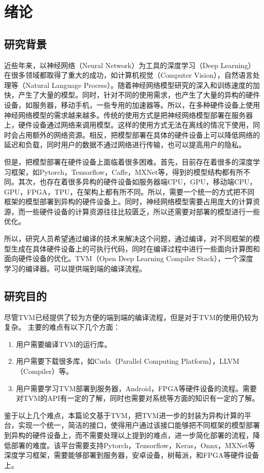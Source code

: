 \chapter{绪论}

\section{研究背景}

近些年来，以神经网络（Neural Network）为工具的深度学习（Deep Learning）在很多领域都取得了重大的成功，如计算机视觉（Computer Vision），自然语言处理等（Natural Language Process）。随着神经网络模型研究的深入和训练速度的加快，产生了大量的模型。同时，针对不同的使用需求，也产生了大量的异构的硬件设备，如服务器，移动手机，一些专用的加速器等。所以，在多种硬件设备上使用神经网络模型的需求越来越多。传统的使用方式是把神经网络模型部署在服务器上，硬件设备通过网络来调用模型。这样的使用方式无法在离线的情况下使用，同时会占用额外的网络资源。相反，把模型部署在具体的硬件设备上可以降低网络的延迟和负载，同时用户的数据不通过网络进行传输，也可以提高用户的隐私。

但是，把模型部署在硬件设备上面临着很多困难。首先，目前存在着很多的深度学习框架，如Pytorch，Tensorflow，Caffe，MXNet等，得到的模型结构都有所不同。其次，也存在着很多异构的硬件设备如服务器端CPU，GPU，移动端CPU，GPU，FPGA，TPU，在架构上都有所不同。所以，需要一个统一的方式把不同框架的模型部署到异构的硬件设备上。同时，神经网络模型需要占用庞大的计算资源，而一些硬件设备的计算资源往往比较匮乏，所以还需要对部署的模型进行一些优化。

所以，研究人员希望通过编译的技术来解决这个问题，通过编译，对不同框架的模型生成在具体硬件设备上的可执行代码，同时在编译过程中进行一些面向计算图和面向硬件设备的优化。TVM（Open Deep Learning Compiler Stack），一个深度学习的编译器。可以提供端到端的编译流程。

\section{研究目的}

尽管TVM已经提供了较为方便的端到端的编译流程，但是对于TVM的使用仍较为复杂。
主要的难点有以下几个方面：
\begin{enumerate}
    \item {用户需要编译TVM的运行库。}
    \item {用户需要下载很多库，如Cuda（Parallel Computing Platform），LLVM（Compiler）等。}
    \item {用户需要学习TVM部署到服务器，Android，FPGA等硬件设备的流程。需要对TVM的API有一定的了解，同时也需要对系统等方面的知识有一定的了解。}
\end{enumerate}
鉴于以上几个难点，本篇论文基于TVM，把TVM进一步的封装为异构计算的平台，实现一个统一，简洁的接口，使得用户通过该接口能够把不同框架的模型部署到异构的硬件设备上，而不需要处理以上提到的难点，进一步简化部署的流程，降低部署的难度。该平台需要支持Pytorch，Tensorflow，Keras，Onnx，MXNet等深度学习框架，需要能够部署到服务器，安卓设备，树莓派，和FPGA等硬件设备上。


